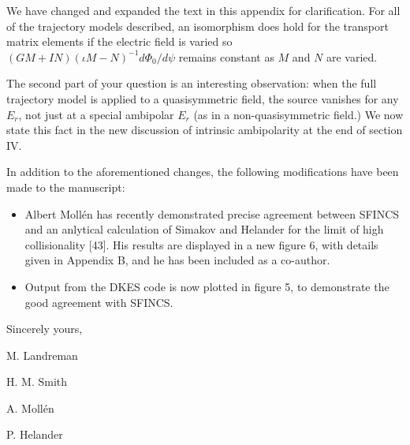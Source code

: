 \documentclass[11pt]{article}
\begin{document}
We have changed and expanded the text in this appendix for clarification. 
For all of the trajectory models described, an isomorphism does hold for the transport matrix elements
if the electric field is varied so
$(GM+IN)(\iota M-N)^{-1} d\Phi_0/d\psi$ remains constant as $M$ and $N$ are varied.

The second part of your question is an interesting observation: when the full trajectory model
is applied to a quasisymmetric field, the source vanishes for any $E_r$, not just at a special ambipolar $E_r$ (as in a non-quasisymmetric field.)
We now state this fact in the new discussion of intrinsic ambipolarity at the end of section IV.

\vspace{0.3in}


In addition to the aforementioned changes, the following modifications have been made to the manuscript:

\begin{itemize}
\item Albert Moll\'{e}n has recently demonstrated precise agreement between SFINCS and an anlytical calculation
of Simakov and Helander for the limit of high collisionality [43]. His results are displayed in a new figure 6, with details given in Appendix B,
 and he has been included as a co-author.
\item Output from the DKES code is now plotted in figure 5, to demonstrate the good agreement with SFINCS.
\end{itemize}


Sincerely yours,\newline

M. Landreman

H. M. Smith

A. Moll\'{e}n

P. Helander
\end{document}
